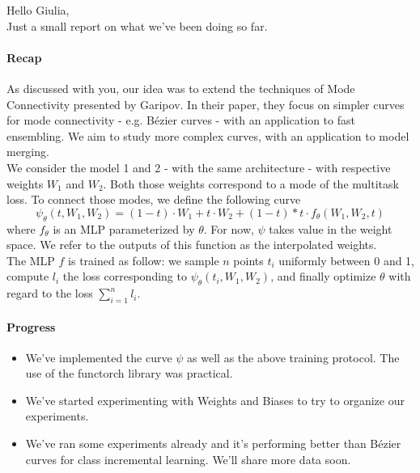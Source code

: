 \documentclass[11pt]{article}
\date{\today}
\begin{document}
Hello Giulia,\\
Just a small report on what we’ve been doing so far.\\

\paragraph*{Recap\\}

As discussed with you, our idea was to extend the techniques of Mode Connectivity presented by Garipov.
In their paper,  they focus on simpler curves for mode connectivity - e.g. Bézier curves - with an application to fast ensembling. We aim to study more complex curves, with an application to model merging.\\

We consider the model 1 and 2 - with the same architecture - with respective weights $W_1$ and $W_2$. Both those weights correspond to a mode of the multitask loss.
To connect those modes, we define the following curve
\begin{equation}
    \psi_\theta (t, W_1, W_2) = (1-t) \cdot W_1 + t \cdot W_2 + (1-t)*t \cdot f_\theta(W_1, W_2, t)
\end{equation}
where $f_\theta$ is an MLP parameterized by $\theta$. For now, $\psi$ takes value in the weight space. We refer to the outputs of this function as the interpolated weights.\\

The MLP $f$ is trained as follow: we sample $n$ points $t_i$ uniformly between 0 and 1, compute $l_i$ the loss corresponding to $\psi_\theta (t_i, W_1, W_2)$, and finally optimize $\theta$ with regard to the loss $\sum_{i=1}^{n} l_i$.

\paragraph*{Progress}
\begin{itemize}
  \item We've implemented the curve $\psi$ as well as the above training protocol. The use of the functorch library was practical.
  \item We've started experimenting with Weights and Biases to try to organize our experiments.
  \item We've ran some experiments already and it's performing better than Bézier curves for class incremental learning. We'll share more data soon.
\end{itemize}
\end{document}
